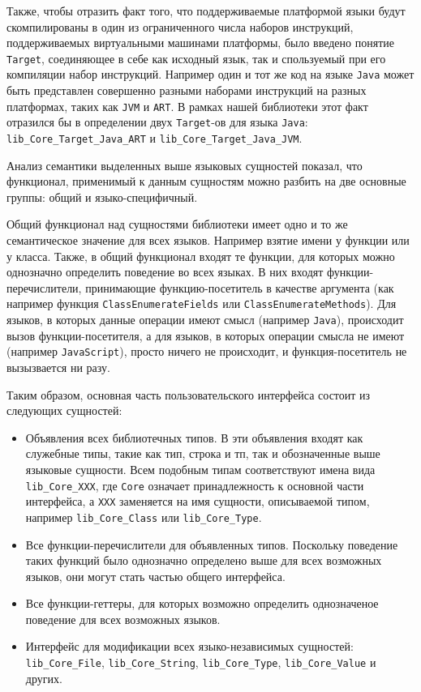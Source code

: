 Также, чтобы отразить факт того, что поддерживаемые платформой языки будут скомпилированы в один из ограниченного числа наборов инструкций, поддерживаемых виртуальными машинами платформы, было введено понятие \texttt{Target}, соединяющее в себе как исходный язык, так и спользуемый при его компиляции набор инструкций. Например один и тот же код на языке \texttt{Java} может быть представлен совершенно разными наборами инструкций на разных платформах, таких как \texttt{JVM} и \texttt{ART}. В рамках нашей библиотеки этот факт отразился бы в определении двух \texttt{Target}-ов для языка \texttt{Java}: \texttt{lib\_Core\_Target\_Java\_ART} и \texttt{lib\_Core\_Target\_Java\_JVM}.

Анализ семантики выделенных выше языковых сущностей показал, что функционал, применимый к данным сущностям можно разбить на две основные группы: общий и языко-специфичный.

Общий функционал над сущностями библиотеки имеет одно и то же семантическое значение для всех языков. Например взятие имени у функции или у класса. Также, в общий функционал входят те функции, для которых можно однозначно определить поведение во всех языках. В них входят функции-перечислители, принимающие функцию-посетитель в качестве аргумента (как например функция \texttt{ClassEnumerateFields} или \texttt{ClassEnumerateMethods}). Для языков, в которых данные операции имеют смысл (например \texttt{Java}), происходит вызов функции-посетителя, а для языков, в которых операции смысла не имеют (например \texttt{JavaScript}), просто ничего не происходит, и функция-посетитель не вызызвается ни разу.

Таким образом, основная часть пользовательского интерфейса состоит из следующих сущностей:

\begin{itemize}
    \item Объявления всех библиотечных типов. В эти объявления входят как служебные типы, такие как тип, строка и тп, так и обозначенные выше языковые сущности. Всем подобным типам соответствуют имена вида \texttt{lib\_Core\_XXX}, где \texttt{Core} означает принадлежность к основной части интерфейса, а \texttt{XXX} заменяется на имя сущности, описываемой типом, например \texttt{lib\_Core\_Class} или \texttt{lib\_Core\_Type}.
    \item Все функции-перечислители для объявленных типов. Поскольку поведение таких функций было однозначно определено выше для всех возможных языков, они могут стать частью общего интерфейса.
    \item Все функции-геттеры, для которых возможно определить однозначеное поведение для всех возможных языков.
    \item Интерфейс для модификации всех языко-независимых сущностей: \texttt{lib\_Core\_File}, \texttt{lib\_Core\_String}, \texttt{lib\_Core\_Type}, \texttt{lib\_Core\_Value} и других.
\end{itemize}

